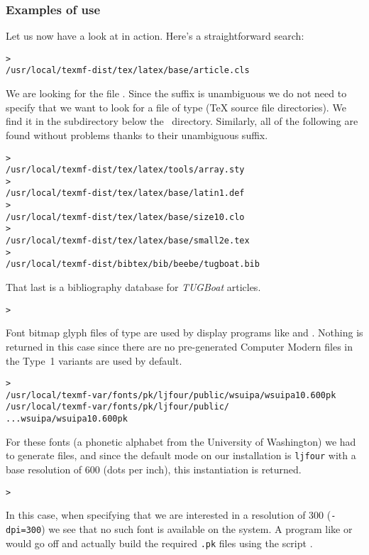 \documentclass{article}
\begin{document}
\begin{multicols}{2}
\subsubsection{Examples of use}
\label{SExamplesofuse}

Let us now have a look at \KPS{} in action.  Here's a straightforward search:

\begin{alltt}
> 
   /usr/local/texmf-dist/tex/latex/base/article.cls
\end{alltt}
We are looking for the file . Since the 
suffix is unambiguous we do not need to specify that we want to look for a
file of type  (\TeX{} source file directories). We find it in
the subdirectory  below the  \TL\
directory.  Similarly, all of the following are found without problems
thanks to their unambiguous suffix.
\begin{alltt}
> 
   /usr/local/texmf-dist/tex/latex/tools/array.sty
> 
   /usr/local/texmf-dist/tex/latex/base/latin1.def
> 
   /usr/local/texmf-dist/tex/latex/base/size10.clo
> 
   /usr/local/texmf-dist/tex/latex/base/small2e.tex
> 
   /usr/local/texmf-dist/bibtex/bib/beebe/tugboat.bib
\end{alltt}

That last is a \BibTeX{} bibliography database for \textsl{TUGBoat} articles.

\begin{alltt}
> 
\end{alltt}
Font bitmap glyph files of type  are used by display
programs like  and .  Nothing is returned in
this case since there are no pre-generated Computer Modern \samp{.pk}
files in \TL{}\Dash the Type~1 variants are used by default.
\begin{alltt}
> 
\ifSingleColumn   /usr/local/texmf-var/fonts/pk/ljfour/public/wsuipa/wsuipa10.600pk
\else /usr/local/texmf-var/fonts/pk/ljfour/public/
...                         wsuipa/wsuipa10.600pk
\fi\end{alltt}

For these fonts (a phonetic alphabet from the University of Washington)
we had to generate \samp{.pk} files, and since the default \MF{} mode on
our installation is \texttt{ljfour} with a base resolution of 600\dpi{}
(dots per inch), this instantiation is returned.
\begin{alltt}
> 
\end{alltt}
In this case, when specifying that we are interested in a resolution
of 300\dpi{} (\texttt{-dpi=300}) we see that no such font is available on
the system. A program like \cmdname{dvips} or \cmdname{xdvi} would
go off and actually build the required \texttt{.pk} files
using the script .


\end{multicols}
\end{document}
